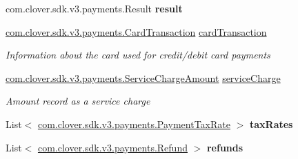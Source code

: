 \begin{DoxyCompactItemize}
\item 
\mbox{\label{classcom_1_1clover_1_1sdk_1_1v3_1_1payments_1_1_payment_a40e0939245f119baf218d64521da4550}} 
com.\+clover.\+sdk.\+v3.\+payments.\+Result {\bfseries result}
\item 
\hyperlink{classcom_1_1clover_1_1sdk_1_1v3_1_1payments_1_1_card_transaction}{com.\+clover.\+sdk.\+v3.\+payments.\+Card\+Transaction} \hyperlink{classcom_1_1clover_1_1sdk_1_1v3_1_1payments_1_1_payment_a31305742a90feeadee5ed273822f8cd6}{card\+Transaction}
\begin{DoxyCompactList}\small\item\em Information about the card used for credit/debit card payments \end{DoxyCompactList}\item 
\hyperlink{classcom_1_1clover_1_1sdk_1_1v3_1_1payments_1_1_service_charge_amount}{com.\+clover.\+sdk.\+v3.\+payments.\+Service\+Charge\+Amount} \hyperlink{classcom_1_1clover_1_1sdk_1_1v3_1_1payments_1_1_payment_ab6703c1a25417778ce48675f3d8b0806}{service\+Charge}
\begin{DoxyCompactList}\small\item\em Amount record as a service charge \end{DoxyCompactList}\item 
\mbox{\label{classcom_1_1clover_1_1sdk_1_1v3_1_1payments_1_1_payment_ad0434f3d49e81b763ac429c12e388d61}} 
List$<$ \hyperlink{classcom_1_1clover_1_1sdk_1_1v3_1_1payments_1_1_payment_tax_rate}{com.\+clover.\+sdk.\+v3.\+payments.\+Payment\+Tax\+Rate} $>$ {\bfseries tax\+Rates}
\item 
\mbox{\label{classcom_1_1clover_1_1sdk_1_1v3_1_1payments_1_1_payment_aa50b9a6d0dc9e7e9b3aa990a95e0f934}} 
List$<$ \hyperlink{classcom_1_1clover_1_1sdk_1_1v3_1_1payments_1_1_refund}{com.\+clover.\+sdk.\+v3.\+payments.\+Refund} $>$ {\bfseries refunds}

\end{DoxyCompactItemize}

